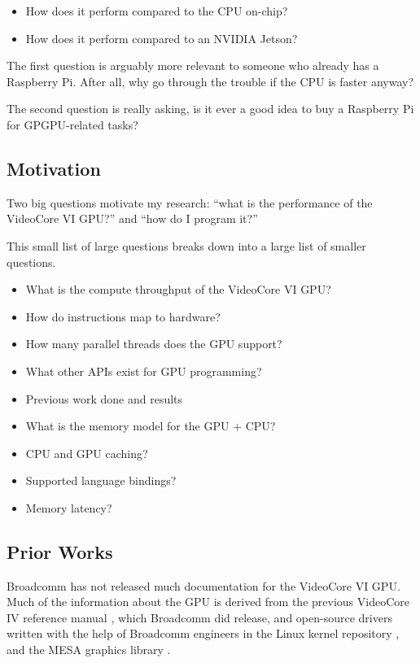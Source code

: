 \documentclass[12pt]{article}
\begin{document}
\begin{itemize}
\item How does it perform compared to the CPU on-chip?
\item How does it perform compared to an NVIDIA Jetson?
\end{itemize}

The first question is arguably more relevant to someone who already has a Raspberry Pi. After all, why go through the trouble if the CPU is faster anyway?

The second question is really asking, is it ever a good idea to buy a Raspberry Pi for GPGPU-related tasks? 

\subsection{Motivation}
Two big questions motivate my research: ``what is the performance of the VideoCore VI GPU?'' and ``how do I program it?''

This small list of large questions breaks down into a large list of smaller questions.

\begin{itemize}
  \item What is the compute throughput of the VideoCore VI GPU?
  \item How do instructions map to hardware?
  \item How many parallel threads does the GPU support?
  \item What other APIs exist for GPU programming?
  \item Previous work done and results
  \item What is the memory model for the GPU + CPU?
  \item CPU and GPU caching?
  \item Supported language bindings?
  \item Memory latency?
\end{itemize}

\subsection{Prior Works}

Broadcomm has not released much documentation for the VideoCore VI GPU. Much of the information about the GPU is derived from the previous VideoCore IV reference manual \cite{videocoreiv}, which Broadcomm did release, and open-source drivers written with the help of Broadcomm engineers in the Linux kernel repository \cite{torvalds_linux_2024}, and the MESA graphics library \cite{external-mesa}. 
\end{document}
